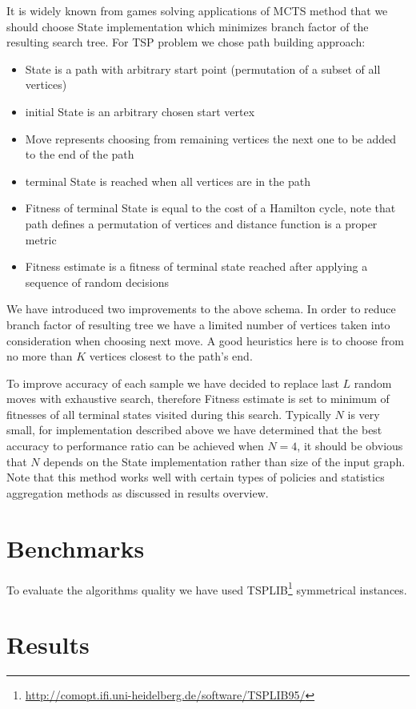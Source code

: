 It is widely known from games solving applications of MCTS method that we
should choose State implementation which minimizes branch factor of the resulting
search tree. For TSP problem we chose path building approach:
\begin{itemize}
  \item State is a path with arbitrary start point (permutation of a subset of
    all vertices)
  \item initial State is an arbitrary chosen start vertex
  \item Move represents choosing from remaining vertices the next one to be
    added to the end of the path
  \item terminal State is reached when all vertices are in the path
  \item Fitness of terminal State is equal to the cost of a Hamilton cycle, note
    that path defines a permutation of vertices and distance function is a proper
    metric
  \item Fitness estimate is a fitness of terminal state reached after applying
    a sequence of random decisions
\end{itemize}

We have introduced two improvements to the above schema. In order to reduce branch
factor of resulting tree we have a limited number of vertices taken into
consideration when choosing next move. A good heuristics here is to choose from
no more than $K$ vertices closest to the path's end.

To improve accuracy of each sample we have decided to replace last $L$ random
moves with exhaustive search, therefore Fitness estimate is set to minimum of
fitnesses of all terminal states visited during this search. Typically $N$ is
very small, for implementation described above we have determined that the best
accuracy to performance ratio can be achieved when $N = 4$, it should be
obvious that $N$ depends on the State implementation rather than size of the
input graph. Note that this method works well with certain types of policies
and statistics aggregation methods as discussed in results overview.

\section{Benchmarks}
To evaluate the algorithms quality we have used
TSPLIB\footnote{\url{http://comopt.ifi.uni-heidelberg.de/software/TSPLIB95/}}
symmetrical instances.

\section{Results}

